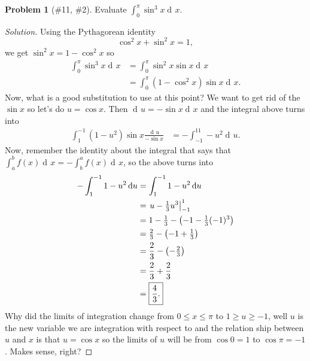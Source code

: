 \documentclass{article}
\theoremstyle{plain}
\theoremstyle{definition}
\newtheorem{problem}[exercise]{Problem}
\theoremstyle{remark}
\DeclareMathOperator{\diff}{d\!}
\begin{document}
\begin{problem}[{\color{Green}\#11}, {\color{Red}\#2}]
Evaluate $\int_0^\pi\sin^3 x\diff x$.
\end{problem}
\begin{proof}[Solution]
Using the Pythagorean identity
\begin{equation}
\label{eq:pythagorean-identity}
\cos^2 x+\sin^2 x=1,
\end{equation}
we get $\sin^2 x=1-\cos^2 x$ so
\begin{align*}
\int_0^\pi\sin^3x\diff x
&=\int_0^\pi\sin^2x\sin x\diff x\\
&=\int_0^\pi\left(1-\cos^2x\right)\sin x\diff x.
\end{align*}
Now, what is a good substitution to use at this point? We want to get rid
of the $\sin x$ so let's do $u=\cos x$. Then $\diff u=-\sin x\diff x$ and
the integral above turns into
\begin{align*}
\int_1^{-1}\left(1-u^2\right)\sin x\frac{\diff u}{-\sin x}
&=-\int_{-1}^11-u^2\diff u.
\end{align*}
Now, remember the identity about the integral that says that
$\int_a^b f(x)\diff x=-\int_b^a f(x)\diff x$, so the above turns into
\begin{align*}
-\int_1^{-1}1-u^2\diff u
&=\int_1^{-1}1-u^2\diff u\\
&=\left.u-\tfrac{1}{3}u^3\right|_{-1}^1\\
&=1-\tfrac{1}{3}-\left(-1-\tfrac{1}{3}(-1)^3\right)\\
&=\tfrac{2}{3}-\left(-1+\tfrac{1}{3}\right)\\
&=\frac{2}{3}-\left(-\tfrac{2}{3}\right)\\
&=\frac{2}{3}+\frac{2}{3}\\
&=\boxed{\frac{4}{3}.}\qedhere
\end{align*}
Why did the limits of integration change from $0\leq x\leq\pi$ to $1\geq
u\geq -1$, well $u$ is the new variable we are integration with respect to
and the relation ship between $u$ and $x$ is that $u=\cos x$ so the limits
of $u$ will be from $\cos 0=1$ to $\cos\pi=-1$. Makes sense, right?
\end{proof}
\end{document}
